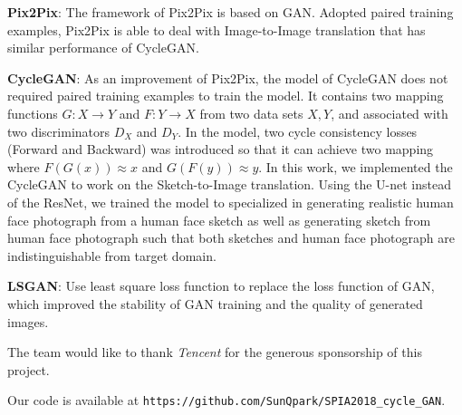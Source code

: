 \textbf{Pix2Pix}: The framework of Pix2Pix is based on GAN. Adopted paired training examples, Pix2Pix is able to deal with Image-to-Image translation that has similar performance of CycleGAN.

\textbf{CycleGAN}: As an improvement of Pix2Pix, the model of CycleGAN does not required paired training examples to train the model. It contains two mapping functions $G:X\rightarrow Y$ and $F:Y\rightarrow X$ from two data sets $X,Y$, and associated with two discriminators $D_{X}$ and $D_{Y}$. In the model, two cycle consistency losses (Forward and Backward) was introduced so that it can achieve two mapping where $F(G(x))\approx x$ and $G(F(y))\approx y$\cite{CycleGAN}. In this work, we implemented the CycleGAN to work on the Sketch-to-Image translation. Using the U-net instead of the ResNet, we trained the model to specialized in generating realistic human face photograph from a human face sketch as well as generating sketch from human face photograph such that both sketches and human face photograph are indistinguishable from target domain.

\textbf{LSGAN}: Use least square loss function to replace the loss function of GAN, which improved the stability of GAN training and the quality of generated images.

The team would like to thank \emph{Tencent} for the generous sponsorship of this project.




Our code is available at \texttt{https://github.com/SunQpark/SPIA2018\_cycle\_GAN}.




\endinput




